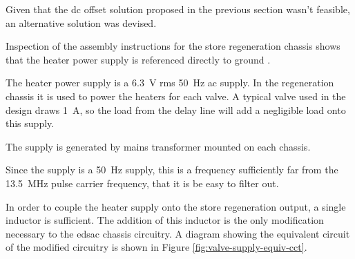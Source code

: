 Given that the \gls{dc} offset solution proposed in the previous section wasn't feasible, an alternative solution was devised.

Inspection of the assembly instructions for the store regeneration chassis shows that the heater power supply is referenced directly to ground \cite{burton2014}.

The heater power supply is a \SI{6.3}{\volt} \gls{rms} \SI{50}{\hertz} \gls{ac} supply. In the regeneration chassis it is used to power the heaters for each valve. A typical valve used in the design draws \SI{1}{\ampere}, so the  load from the delay line will add a negligible load onto this supply.

The supply is generated by mains transformer mounted on each chassis.

Since the supply is a \SI{50}{\hertz} supply, this is a frequency sufficiently far from the \SI{13.5}{\mega\hertz} pulse carrier frequency, that it is be easy to filter out.

In order to couple the heater supply onto the store regeneration output, a single inductor is sufficient. The addition of this inductor is the only modification necessary to the \gls{edsac} chassis circuitry. A diagram showing the equivalent circuit of the modified circuitry is shown in Figure \ref{fig:valve-supply-equiv-cct}.

